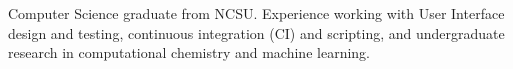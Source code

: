 
\begin{cvparagraph}
Computer Science graduate from NCSU. Experience working with User Interface design and testing, continuous integration (CI) and scripting, and undergraduate research in computational chemistry and machine learning.
\end{cvparagraph}
